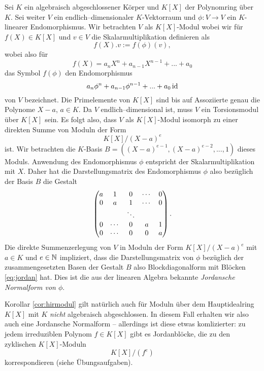 \documentclass{book}
\begin{document}
\begin{exa}
    \label{exa:jordancanonical}
    Sei $K$ ein algebraisch abgeschlossener Körper und $K[X]$ der Polynomring
    über $K$. Sei weiter $V$ ein endlich--dimensionaler $K$-Vektorraum und
    $\phi: V \to V$ ein $K$-linearer Endomorphismus. 
    Wir betrachten $V$ als $K[X]$-Modul wobei wir für $f(X) \in K[X]$ und $v \in V$ die Skalarmultiplikation definieren als
    \[
        f(X).v := f(\phi)(v), 
    \]
    wobei also für 
    \[
        f(X) = a_n X^n + a_{n-1} X^{n-1} + ... + a_0
    \]
    das Symbol $f(\phi)$ den Endomorphismus 
    \[
        a_n \phi^n + a_{n-1} \phi^{n-1} + ... + a_0 \id
    \]
    von $V$ bezeichnet. Die Primelemente von $K[X]$ sind bis auf Assoziierte
    genau die Polynome $X-a$, $a \in K$. Da $V$ endlich--dimensional ist, muss
    $V$ ein Torsionsmodul über $K[X]$ sein. Es folgt also, dass $V$ als
    $K[X]$-Modul isomorph zu einer direkten Summe von Moduln der Form
    \[
        K[X]/(X-a)^e
    \]
    ist. Wir betrachten die $K$-Basis $B = ((X-a)^{e-1}, (X-a)^{e-2}, ..., 1)$
    dieses Moduls. Anwendung des Endomorphismus $\phi$ entspricht der
    Skalarmultiplikation mit $X$. Daher hat die Darstellungsmatrix des Endomorphismus $\phi$ also
    bezüglich der Basis $B$ die Gestalt
    \begin{equation}
        \label{eq:jordan}
    \begin{pmatrix}  a & 1 & 0 &  \cdots & 0\\
        0 & a &  1 &  \cdots & 0\\
          & & \ddots & &  \\
        0 & \cdots  & 0 &  a & 1\\
        0 & \cdots & 0 & 0 & a \end{pmatrix}.
    \end{equation}
    Die direkte Summenzerlegung von $V$ in Moduln der Form $K[X]/(X-a)^e$ mit
    $a \in K$ und $e \in \mathbb{N}$ impliziert, dass die Darstellungsmatrix von
    $\phi$ bezüglich der zusammengesetzten Basen der Gestalt $B$ also
    Blockdiagonalform mit Blöcken \eqref{eq:jordan} hat. Dies ist
    die aus der linearen Algebra bekannte {\em Jordansche Normalform von
    $\phi$}. 

    Korollar \ref{cor:hirmodul} gilt natürlich auch für Moduln über dem
    Hauptidealring $K[X]$ mit $K$ {\em nicht} algebraisch abgeschlossen. In
    diesem Fall erhalten wir also auch eine Jordansche Normalform -- allerdings
    ist diese etwas komlizierter: zu jedem irreduziblen Polynom $f \in K[X]$
    gibt es Jordanblöcke, die zu den zyklischen $K[X]$-Moduln
    \[
        K[X]/(f^e)
    \]
    korrespondieren (siehe Übungsaufgaben).
\end{exa}
\end{document}
